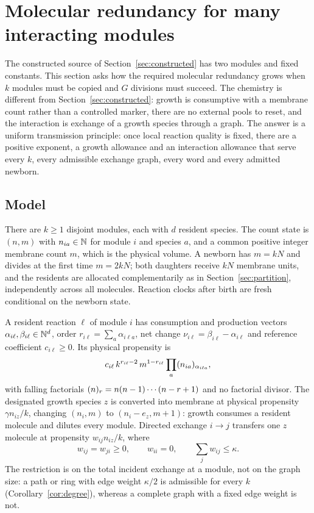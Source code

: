 \section{Molecular redundancy for many interacting modules}\label{sec:redundancy}

The constructed source of Section~\ref{sec:constructed} has two modules and fixed constants. This section asks how the required molecular redundancy grows when $k$ modules must be copied and $G$ divisions must succeed. The chemistry is different from Section~\ref{sec:constructed}: growth is consumptive with a membrane count rather than a controlled marker, there are no external pools to reset, and the interaction is exchange of a growth species through a graph. The answer is a uniform transmission principle: once local reaction quality is fixed, there are a positive exponent, a growth allowance and an interaction allowance that serve every $k$, every admissible exchange graph, every word and every admitted newborn.

\subsection{Model}\label{sec:redmodel}
There are $k\ge1$ disjoint modules, each with $d$ resident species. The count state is $(n,m)$ with $n_{ia}\in\mathbb N$ for module $i$ and species $a$, and a common positive integer membrane count $m$, which is the physical volume. A newborn has $m=kN$ and divides at the first time $m=2kN$; both daughters receive $kN$ membrane units, and the residents are allocated complementarily as in Section~\ref{sec:partition}, independently across all molecules. Reaction clocks after birth are fresh conditional on the newborn state.

A resident reaction $\ell$ of module $i$ has consumption and production vectors $\alpha_{i\ell},\beta_{i\ell}\in\mathbb N^d$, order $r_{i\ell}=\sum_a\alpha_{i\ell a}$, net change $\nu_{i\ell}=\beta_{i\ell}-\alpha_{i\ell}$ and reference coefficient $c_{i\ell}\ge0$. Its physical propensity is
\begin{equation}\label{eq:physical}
 c_{i\ell}\,k^{r_{i\ell}-2}\,m^{1-r_{i\ell}}\prod_a(n_{ia})_{\alpha_{i\ell a}},
\end{equation}
with falling factorials $(n)_{r}=n(n-1)\cdots(n-r+1)$ and no factorial divisor. The designated growth species $z$ is converted into membrane at physical propensity $\gamma n_{iz}/k$, changing $(n_i,m)$ to $(n_i-e_z,m+1)$: growth consumes a resident molecule and dilutes every module. Directed exchange $i\to j$ transfers one $z$ molecule at propensity $w_{ij}n_{iz}/k$, where
\begin{equation}\label{eq:graph}
 w_{ij}=w_{ji}\ge0,\qquad w_{ii}=0,\qquad\sum_jw_{ij}\le\kappa .
\end{equation}
The restriction is on the total incident exchange at a module, not on the graph size: a path or ring with edge weight $\kappa/2$ is admissible for every $k$ (Corollary~\ref{cor:degree}), whereas a complete graph with a fixed edge weight is not.

